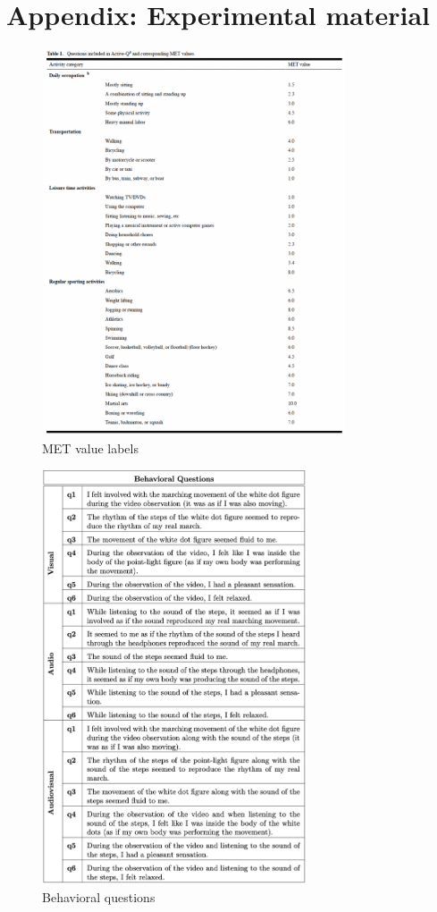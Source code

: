 \chapter*{Appendix: Experimental material}
\begin{figure}[ht]
    \centering
    \includegraphics[width=0.8\textwidth]{appendix/met_values.png}
    \caption{MET value labels \parencite{Bonn_2012}}
    \label{fig: met_values}
\end{figure}
\begin{figure}[ht]
    \centering
    \includegraphics[width=0.70\textwidth]{appendix/questions.png}
    \caption{Behavioral questions}
    \label{fig: Behavioral questions}
\end{figure}

